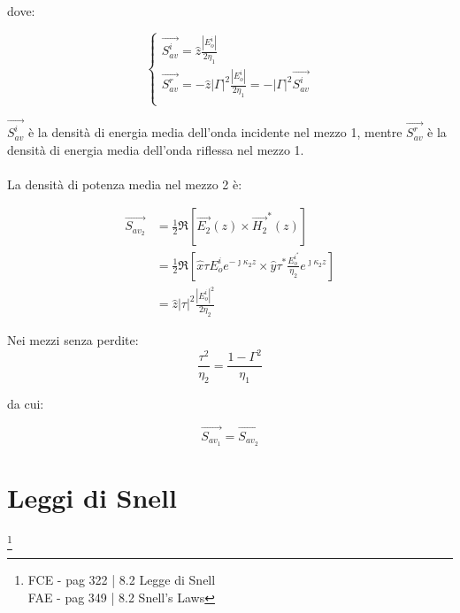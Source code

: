 dove: 

{\Large \begin{equation}
    \begin{cases}
        \vec{S_{av} ^{i}} = \hat{z} \frac{\left|E_o ^{i}\right|}{2 \eta_1} \\ 
        \vec{S_{av} ^{r}} = - \hat{z}  \left|\Gamma\right|^{2} \frac{\left|E_o ^{i}\right|}{2 \eta_1} = - \left|\Gamma\right|^{2} \vec{S_{av} ^{i}}\\ 
    \end{cases}
\end{equation}}

$\vec{S_{av} ^{i}}$ è la densità di energia media dell'onda incidente nel mezzo 1, 
mentre $\vec{S_{av} ^{r}}$ è la densità di energia media dell'onda riflessa nel mezzo 1. \\ \\ 

La densità di potenza media nel mezzo 2 è: 

{\Large \begin{equation}
    \begin{split}
    \vec{S_{av_2}} &= \frac{1}{2} \Re [\vec{E_2}(z) \times \vec{H_2} ^ {*} (z) ] \\
    &= \frac{1}{2} \Re [\hat{x} \tau E_o ^{i} e^{-\jmath \kappa_2 z} \times  \hat{y} \tau^{*} \frac{E_o ^{i^*}}{\eta_2} e^{\jmath \kappa_2 z}] \\ 
    &= \hat{z} \left|\tau\right| ^{2} \frac{\left|E_o ^{i}\right| ^{2}}{2 \eta_2}
    \end{split}
\end{equation}}

Nei mezzi senza perdite: 
{\Large \begin{equation}
    \frac{\tau ^{2}}{\eta_2} = \frac{1 - \Gamma ^{2}}{\eta_1}
\end{equation}} 

da cui: 

{\Large \begin{equation}
    \vec{S_{av_1}} = \vec{S_{av_2}} 
\end{equation}}

\newpage


\section{Leggi di Snell} 

\footnote{FCE - pag 322 | 8.2 Legge di Snell \\ 
FAE - pag 349 | 8.2 Snell's Laws} 

